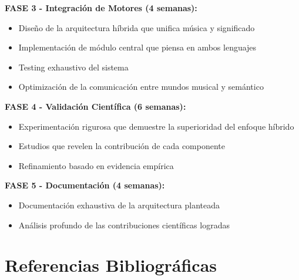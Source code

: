 \documentclass[12pt,a4paper]{article}
\begin{document}
\textbf{FASE 3 - Integración de Motores (4 semanas):}
\begin{itemize}
    \item Diseño de la arquitectura híbrida que unifica música y significado
    \item Implementación de módulo central que piensa en ambos lenguajes
    \item Testing exhaustivo del sistema
    \item Optimización de la comunicación entre mundos musical y semántico
\end{itemize}

\textbf{FASE 4 - Validación Científica (6 semanas):}
\begin{itemize}
    \item Experimentación rigurosa que demuestre la superioridad del enfoque híbrido
    \item Estudios que revelen la contribución de cada componente
    \item Refinamiento basado en evidencia empírica
\end{itemize}

\textbf{FASE 5 - Documentación (4 semanas):}
\begin{itemize}
    \item Documentación exhaustiva de la arquitectura planteada
    \item Análisis profundo de las contribuciones científicas logradas
\end{itemize}

\section{Referencias Bibliográficas}
\end{document}
